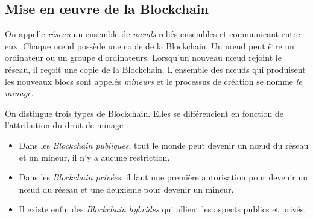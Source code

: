 \documentclass{article}
\newcommand{\oeuvre}{\oe uvre }
\newcommand{\noeud}{n\oe ud }
\newcommand{\noeuds}{n\oe uds }
\begin{document}




\subsection{Mise en \oeuvre de la Blockchain}

On appelle \textit{réseau} un ensemble de \textit{\noeuds}reliés ensembles et communicant entre eux. Chaque \noeud possède une copie de la Blockchain. Un \noeud peut être un ordinateur ou un groupe d'ordinateurs. Lorsqu'un nouveau \noeud rejoint le réseau, il reçoit une copie de la Blockchain. L'ensemble des \noeuds qui produisent les nouveaux blocs sont appelés \textit{mineurs} et le processus de création se nomme \textit{le minage}.

On distingue trois types de Blockchain. Elles se différencient en fonction de l'attribution du droit de minage : 
\begin{itemize}
    \item Dans les \textit{Blockchain publiques}, tout le monde peut devenir un \noeud du réseau et un mineur, il n'y a aucune restriction.
    \item Dans les \textit{Blockchain privées}, il faut une première autorisation pour devenir un \noeud du réseau et une deuxième pour devenir un mineur.
    \item Il existe enfin des \textit{Blockchain hybrides} qui allient les aspects publics et privés.
\end{itemize}
\end{document}
